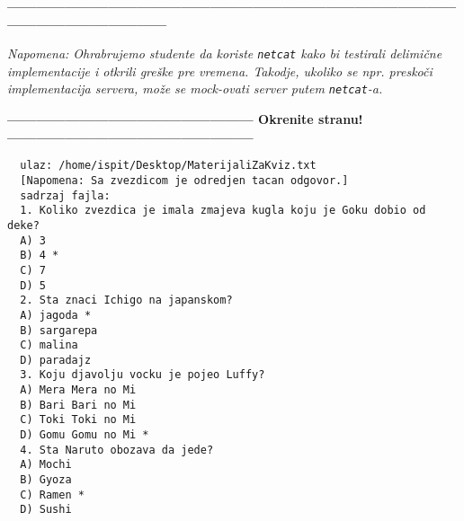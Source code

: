 \documentclass[]{article}
\begin{document}
\begin{enumerate}
\vspace{20pt}
\begin{center}
  \textbf{------------------------------------------------------------------------------------------------------------------------------}
\end{center}
\textit{Napomena: Ohrabrujemo studente da koriste \texttt{netcat} kako bi testirali delimi\v{c}ne implementacije i otkrili gre\v{s}ke pre vremena. Takodje, ukoliko se npr. presko\v{c}i implementacija servera, mo\v{z}e se mock-ovati server putem \texttt{netcat}-a.} 
\begin{center}
  \textbf{--------------------------------------------------- Okrenite stranu! ---------------------------------------------------}
\end{center}
\newpage

\noindent
\begin{lstlisting}
  ulaz: /home/ispit/Desktop/MaterijaliZaKviz.txt
  [Napomena: Sa zvezdicom je odredjen tacan odgovor.]
  sadrzaj fajla:
  1. Koliko zvezdica je imala zmajeva kugla koju je Goku dobio od deke?
  A) 3
  B) 4 *
  C) 7
  D) 5
  2. Sta znaci Ichigo na japanskom?
  A) jagoda *
  B) sargarepa
  C) malina
  D) paradajz
  3. Koju djavolju vocku je pojeo Luffy?
  A) Mera Mera no Mi
  B) Bari Bari no Mi
  C) Toki Toki no Mi
  D) Gomu Gomu no Mi *
  4. Sta Naruto obozava da jede?
  A) Mochi
  B) Gyoza
  C) Ramen *
  D) Sushi
\end{lstlisting}

\vspace{20pt}


\end{enumerate}
\end{document}
